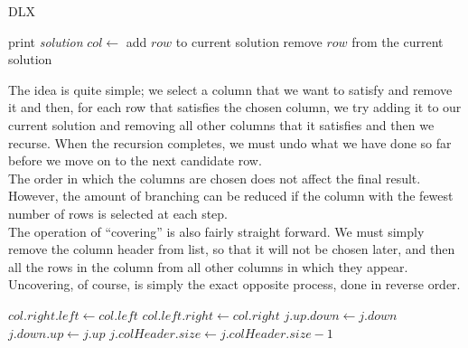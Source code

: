\documentclass[12pt]{article}
\newcounter{row}
\newcounter{col}
\begin{document}
\begin{algorithm}[H]
\caption{DLX}\label{search}
\begin{algorithmic}[1]
\State print \textit{solution}
\State \Return
\EndIf
\State $col \gets$ 
\State {}
\State add $row$ to current solution
\State {}
\EndFor
\State {}
\State {}
\EndFor
\State remove $row$ from the current solution
\EndFor
\State {}
\EndProcedure
\end{algorithmic}
\end{algorithm}


The idea is quite simple; we select a column that we want to satisfy and remove it and then, for each row that satisfies the chosen column, we try adding it to our current solution and removing all other columns that it satisfies and then we recurse. When the recursion completes, we must undo what we have done so far before we move on to the next candidate row. \\ 

The order in which the columns are chosen does not affect the final result. However, the amount of branching can be reduced if the column with the fewest number of rows is selected at each step. \\

The operation of ``covering'' is also fairly straight forward. We must simply remove the column header from list, so that it will not be chosen later, and then all the rows in the column from all other columns in which they appear. Uncovering, of course, is simply the exact opposite process, done in reverse order. \\

\begin{algorithm}[!ht]
\label{cover}
\begin{algorithmic}
\State $col.right.left \gets col.left$
\State $col.left.right \gets col.right$
\State $j.up.down \gets j.down$
\State $j.down.up \gets j.up$
\State $j.colHeader.size \gets j.colHeader.size - 1$
\EndFor
\EndFor
\EndProcedure
\end{algorithmic}
\end{algorithm}
\end{document}
